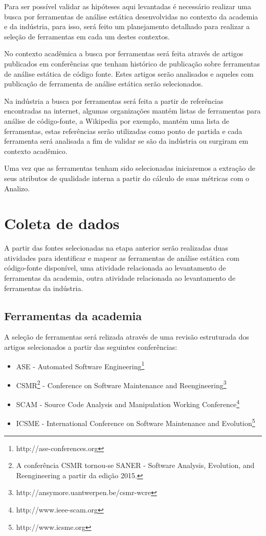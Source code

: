 \documentclass[qual, classic, a4paper]{ufbathesis}
\begin{document}
Para ser possível validar as hipóteses aqui levantadas é necessário realizar
uma busca por ferramentas de análise estática desenvolvidas no contexto da
academia e da indústria, para isso, será feito um planejamento detalhado para
realizar a seleção de ferramentas em cada um destes contextos.

No contexto acadêmica a busca por ferramentas será feita
através de artigos publicados em conferências que tenham histórico de
publicação sobre ferramentas de análise estática de código fonte. Estes
artigos serão analisados e aqueles com publicação de ferramenta de análise
estática serão selecionados.

Na indústria a busca por ferramentas será feita a partir
de referências encontradas na internet, algumas organizações mantém listas de
ferramentas para análise de código-fonte, a Wikipedia por exemplo, mantém uma lista
de ferramentas, estas referências serão utilizadas como ponto de partida e
cada ferramenta será analisada a fim de validar se são da indústria ou
surgiram em contexto acadêmico.

Uma vez que as ferramentas tenham sido selecionadas iniciaremos a extração de
seus atributos de qualidade interna a partir do cálculo de suas métricas com o
Analizo.

\section{Coleta de dados}

A partir das fontes selecionadas na etapa anterior serão realizadas duas
atividades para identificar e mapear as ferramentas de análise estática com
código-fonte disponível, uma atividade relacionada ao levantamento de
ferramentas da academia, outra atividade relacionada ao levantamento de
ferramentas da indústria.

\subsection{Ferramentas da academia}

A seleção de ferramentas será relizada através de uma revisão estruturada dos
artigos selecionados a partir das seguintes conferências:

\begin{itemize}
  \item ASE - Automated Software
    Engineering\footnote{http://ase-conferences.org}
  \item CSMR\footnote{A conferência CSMR tornou-se SANER - Software Analysis,
    Evolution, and Reengineering a partir da edição 2015.} - Conference on
    Software Maintenance and
    Reengineering\footnote{http://ansymore.uantwerpen.be/csmr-wcre}
  \item SCAM - Source Code Analysis and Manipulation Working
    Conference\footnote{http://www.ieee-scam.org}
  \item ICSME - International Conference on Software Maintenance and
    Evolution\footnote{http://www.icsme.org}
\end{itemize}
\end{document}

